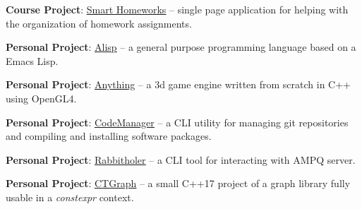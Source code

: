 \documentclass[letterpaper,10pt]{article}
\newcommand{\resumeItem}[2]{
\item\small{
    \textbf{#1}{: #2 \vspace{-2pt}}
  }
}
\newcommand{\resumeSubItem}[2]{\resumeItem{#1}{#2}\vspace{-4pt}}
\begin{document}
\resumeSubItem{Course Project}
{\href{https://github.com/palikar/HomeworksSmart/}{\color{blue}\underline{Smart Homeworks}} -- single page application for helping with the organization of homework assignments.\@
}

\resumeSubItem{Personal Project}
{\href{https://github.com/palikar/alisp}{\color{blue}\underline{Alisp}} -- a general purpose programming language based on a Emacs Lisp.
}

\resumeSubItem{Personal Project}
{\href{https://github.com/palikar/anything}{\color{blue}\underline{Anything}} -- a 3d game engine written from scratch in C++ using OpenGL4.
}

\resumeSubItem{Personal Project}
{\href{https://github.com/palikar/code_manager}{\color{blue}\underline{CodeManager}} -- a CLI utility for managing git repositories and compiling and installing software packages.
}

\resumeSubItem{Personal Project}
{\href{https://github.com/palikar/rabbitholer}{\color{blue}\underline{Rabbitholer}} -- a CLI tool for interacting with AMPQ server.
}

\resumeSubItem{Personal Project}
{\href{https://github.com/palikar/ctgraph}{\color{blue}\underline{CTGraph}} -- a small C++17 project of a graph library fully usable in a \emph{constexpr} context.
}
\end{document}
